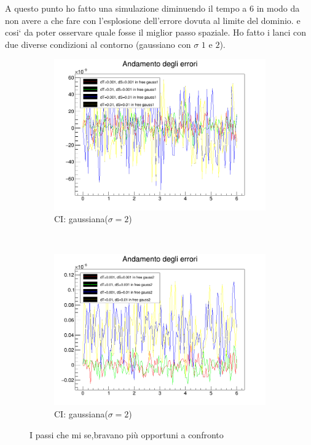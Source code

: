 A questo punto ho fatto una simulazione diminuendo il tempo a $6$ in modo da non avere a che fare con l'esplosione dell'errore dovuta al limite del dominio. e cosi` da poter osservare quale fosse il miglior passo spaziale. Ho fatto i lanci con due diverse condizioni al contorno (gaussiano con $\sigma$ $1$ e $2$). 

\begin{figure}[ht]
	\centering
	\begin{subfigure}[b]{0.49\textwidth}
		\includegraphics[width=\textwidth]{IMG/eChoosy1}
		\caption{CI: gaussiana($\sigma=2$)}
	\end{subfigure}
	~
	\begin{subfigure}[b]{0.49\textwidth}
		\includegraphics[width=\textwidth]{IMG/eChoosy2}
		\caption{CI: gaussiana($\sigma=2$)}
	\end{subfigure}
	\caption{I passi che mi se,bravano pi\`u opportuni a confronto}\label{fig:SceltaErrori}
\end{figure}

